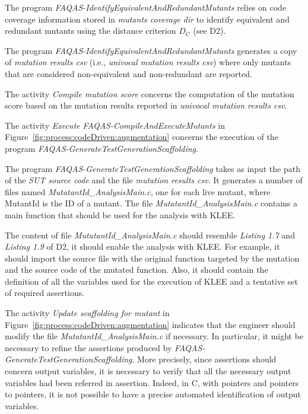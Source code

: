 \RQ{} The program \emph{FAQAS-IdentifyEquivalentAndRedundantMutants} relies on code coverage information stored in \emph{mutants coverage dir} to identify equivalent and redundant mutants using the distance criterion $D_C$ (see D2).

\RQ{} The program \emph{FAQAS-IdentifyEquivalentAndRedundantMutants} generates a copy of \emph{mutation results csv} (i.e., \emph{univocal mutation results csv}) where only mutants that are considered non-equivalent and non-redundant are reported.

\RQ{} The activity \emph{Compile mutation score} concerns the computation of the mutation score based on the mutation results reported in \emph{univocal mutation results csv}.

\RQ{} The activity \emph{Execute FAQAS-CompileAndExecuteMutants} in Figure~\ref{fig:process:codeDriven:augmentation} concerns the execution of the program \emph{FAQAS-GenerateTestGenerationScaffolding}.

\RQ{} The program \emph{FAQAS-GenerateTestGenerationScaffolding} takes as input the path of the \emph{SUT source code} and the file \emph{mutation results csv}. It generates a number of files named \emph{MutatantId\_AnalysisMain.c}, one for each live mutant, where MutantId is the ID of a mutant. The file \emph{MutatantId\_AnalysisMain.c} contains a main function that should be used for the analysis with KLEE. 

\RQ{} The content of file \emph{MutatantId\_AnalysisMain.c} should resemble \emph{Listing 1.7} and \emph{Listing 1.9} of D2, it should enable the analysis with KLEE. For example, it should import the source file with the original function targeted by the mutation and the source code of the mutated function. Also, it should contain the definition of all the variables used for the execution of KLEE and a tentative set of required assertions.

\RQ{} The activity \emph{Update scaffolding for mutant} in Figure~\ref{fig:process:codeDriven:augmentation} indicates that the engineer should modify the file  \emph{MutatantId\_AnalysisMain.c} if necessary. In particular, it might be necessary to refine the assertions produced by \emph{FAQAS-GenerateTestGenerationScaffolding}. More precisely, since assertions should concern output variables, it is necessary to verify that all the necessary output variables had been referred in assertion. Indeed, in C, with pointers and pointers to pointers, it is not possible to have a precise automated identification of output variables.

